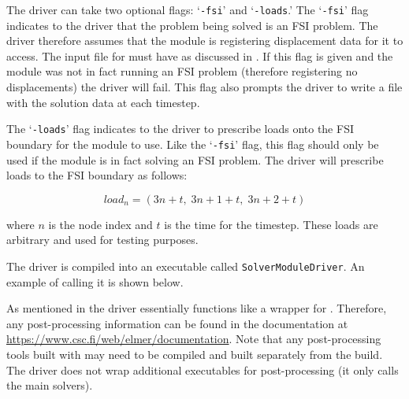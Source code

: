 The \irprogram driver can take two optional flags: `\texttt{-fsi}' and `\texttt{-loads}.' The `\texttt{-fsi}' flag indicates to the driver that the problem being solved is an FSI problem. The driver therefore assumes that the module is registering displacement data for it to access. The input file for \elmer must have  as discussed in . If this flag is given and the module was not in fact running an FSI problem (therefore registering no displacements) the driver will fail. This flag also prompts the driver to write a  file with the solution data at each timestep. 

The `\texttt{-loads}' flag indicates to the driver to prescribe loads onto the FSI boundary for the module to use. Like the `\texttt{-fsi}' flag, this flag should only be used if the module is in fact solving an FSI problem. The driver will prescribe loads to the FSI boundary as follows:

\begin{equation}
load_n = (3n + t,\; 3n + 1 + t,\; 3n + 2 + t)
\end{equation}

where $n$ is the node index and $t$ is the time for the timestep. These loads are arbitrary and used for testing purposes.

The \irprogram driver is compiled into an executable called \texttt{SolverModuleDriver}. An example of calling it is shown below.


As mentioned in  the driver essentially functions like a wrapper for \elmer\!\!. Therefore, any post-processing information can be found in the \elmer documentation at \url{https://www.csc.fi/web/elmer/documentation}. Note that any post-processing tools built with \elmer may need to be compiled and built separately from the \irprogram build. The driver does not wrap additional executables for post-processing (it only calls the main \elmer solvers).


